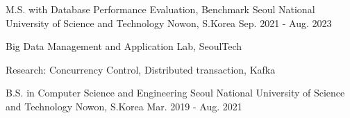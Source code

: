 

\begin{cventries}

  \cventry
    {M.S. with Database Performance Evaluation, Benchmark} %
    {Seoul National University of Science and Technology} %
    {Nowon, S.Korea} %
    {Sep. 2021 - Aug. 2023} %
    {
      \begin{cvitems} %
        \item {Big Data Management and Application Lab, SeoulTech}
        \item {Research: Concurrency Control, Distributed transaction, Kafka}
      \end{cvitems}
    }

  \cventry
    {B.S. in Computer Science and Engineering} %
    {Seoul National University of Science and Technology} %
    {Nowon, S.Korea} %
    {Mar. 2019 - Aug. 2021} %
    {
      \begin{cvitems} %
      \end{cvitems}
    }

\end{cventries}
